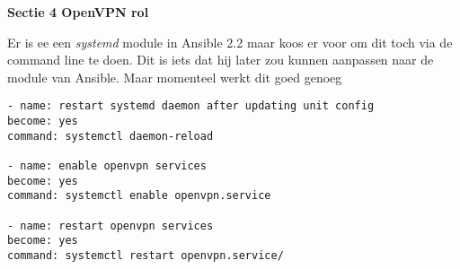 \textbf{Sectie 4 OpenVPN rol}

Er is ee een \textit{systemd} module in Ansible 2.2 maar \autocite{scottharney} koos er voor om dit toch via de command line te doen. Dit is iets dat hij later zou kunnen aanpassen naar de module van Ansible. Maar momenteel werkt dit goed genoeg
\begin{lstlisting}
- name: restart systemd daemon after updating unit config
become: yes
command: systemctl daemon-reload

- name: enable openvpn services
become: yes
command: systemctl enable openvpn.service

- name: restart openvpn services
become: yes
command: systemctl restart openvpn.service/
\end{lstlisting}











